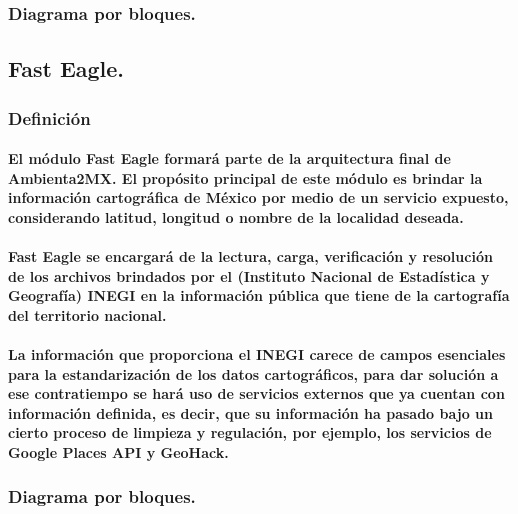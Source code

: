   	\subsubsection{Diagrama por bloques.}
  \subsection{Fast Eagle.}
	  \subsubsection{Definición}
	  	\paragraph{El módulo Fast Eagle formará parte de la arquitectura final de Ambienta2MX. El propósito principal de este módulo es brindar la información cartográfica de México por medio de un servicio expuesto, considerando latitud, longitud o nombre de la localidad deseada.}
  		\paragraph{Fast Eagle se encargará de la lectura, carga, verificación y resolución de los archivos brindados por el (Instituto Nacional de Estadística y Geografía) INEGI en la información pública que tiene de la cartografía del territorio nacional.}
	  	\paragraph{La información que proporciona el INEGI carece de campos esenciales para la estandarización de los datos cartográficos, para dar solución a ese contratiempo se hará uso de servicios externos que ya cuentan con información definida, es decir, que su información ha pasado bajo un cierto proceso de limpieza y regulación, por ejemplo, los servicios de Google Places API y GeoHack.}
	  \subsubsection{Diagrama por bloques.}

